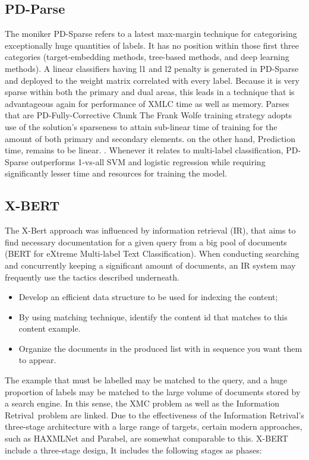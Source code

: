\documentclass[a4paper]{article}
\begin{document}
\subsection{PD-Parse}
The moniker PD-Sparse refers to a latest max-margin technique for categorising exceptionally huge quantities of labels. It has no position within those first three categories (target-embedding methods, tree-based methods, and deep learning methods). A linear classifiers having l1 and l2 penalty is generated in PD-Sparse and deployed to the weight matrix correlated with every label. Because it is very sparse within both the primary and dual areas, this leads in a technique that is advantageous again for performance of XMLC time as well as memory. Parses that are PD-Fully-Corrective Chunk The Frank Wolfe training strategy adopts use of the solution's sparseness to attain sub-linear time of training for the amount of both primary and secondary elements. on the other hand, Prediction time, remains to be linear. \cite{bib6}. Whenever it relates to multi-label classification, PD-Sparse outperforms 1-vs-all SVM and logistic regression while requiring significantly lesser time and resources for training the model.

\subsection{X-BERT}
The X-Bert approach was influenced by information retrieval (IR), that aims to find necessary documentation for a given query from a big pool of documents (BERT for eXtreme Multi-label Text Classification). When conducting searching and concurrently keeping a significant amount of documents, an IR system may frequently use the tactics described underneath.
\begin{itemize}
    \item Develop an efficient data structure to be used for indexing the content;
    \item By using matching technique, identify the content id that matches to this content example.
    \item Organize the documents in the produced list with in sequence you want them to appear.
\end{itemize}

The example that must be labelled may be matched to the query, and a huge proportion of labels may be matched to the large volume of documents stored by a search engine. In this sense, the XMC problem as well as the Information Retrival problem are linked. Due to the effectiveness of the Information Retrival's three-stage architecture with a large range of targets, certain modern approaches, such as HAXMLNet and Parabel, are somewhat comparable to this. X-BERT include a three-stage design, It includes the following stages as phases:
\end{document}
